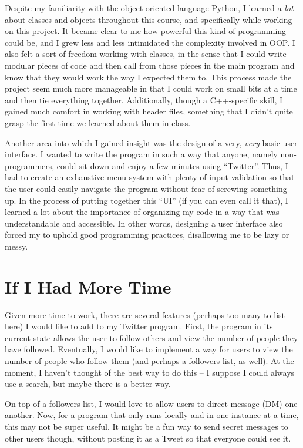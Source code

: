 \documentclass[twocolumn]{article}
\begin{document}
Despite my familiarity with the object-oriented language Python, I learned a \textit{lot} about classes and objects throughout this course, and specifically while working on this project. It became clear to me how powerful this kind of programming could be, and I grew less and less intimidated the complexity involved in OOP\@. I also felt a sort of freedom working with classes, in the sense that I could write modular pieces of code and then call from those pieces in the main program and know that they would work the way I expected them to. This process made the project seem much more manageable in that I could work on small bits at a time and then tie everything together. Additionally, though a C++-specific skill, I gained much comfort in working with header files, something that I didn't quite grasp the first time we learned about them in class.

Another area into which I gained insight was the design of a very, \textit{very} basic user interface. I wanted to write the program in such a way that anyone, namely non-programmers, could sit down and enjoy a few minutes using ``Twitter''. Thus, I had to create an exhaustive menu system with plenty of input validation so that the user could easily navigate the program without fear of screwing something up. In the process of putting together this ``UI'' (if you can even call it that), I learned a lot about the importance of organizing my code in a way that was understandable and accessible. In other words, designing a user interface also forced my to uphold good programming practices, disallowing me to be lazy or messy.

\section*{If I Had More Time}

Given more time to work, there are several features (perhaps too many to list here) I would like to add to my Twitter program. First, the program in its current state allows the user to follow others and view the number of people they have followed. Eventually, I would like to implement a way for users to view the number of people who follow them (and perhaps a followers list, as well). At the moment, I haven't thought of the best way to do this – I suppose I could always use a search, but maybe there is a better way.

On top of a followers list, I would love to allow users to direct message (DM) one another. Now, for a program that only runs locally and in one instance at a time, this may not be super useful. It might be a fun way to send secret messages to other users though, without posting it as a Tweet so that everyone could see it.
\end{document}
